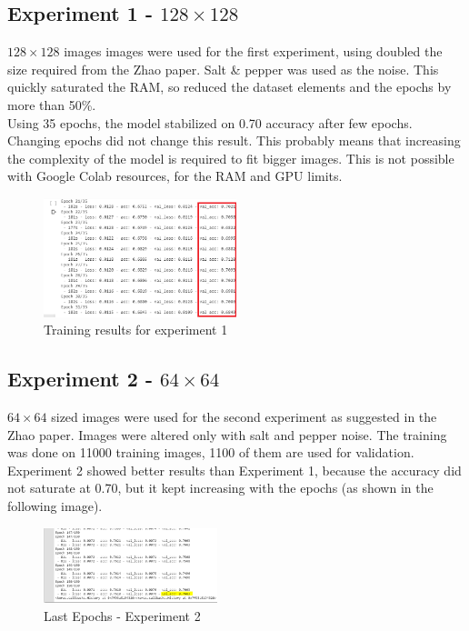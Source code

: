 \documentclass[twocolumn,showpacs,%
  nofootinbib,aps,superscriptaddress,%
  eqsecnum,prd,notitlepage,showkeys,10pt]{revtex4-1}
\begin{document}
\subsection{Experiment 1 - $128\times128$}\label{subs:ex1}
$128\times128$ images images were used for the first experiment, using doubled the size required from the Zhao paper. Salt \& pepper was used as the noise. This quickly saturated the RAM, so reduced the dataset elements and the epochs by more than 50\%.\\
Using 35 epochs, the model stabilized on 0.70 accuracy after few epochs. Changing epochs did not change this result. This probably means that increasing the complexity of the model is required to fit bigger images. This is not possible with Google Colab resources, for the RAM and GPU limits.\\
\begin{figure}[H]
\includegraphics[width=0.5\textwidth]{images/128x128_35epoch_10batch_fit.png}
\caption{\label{fig:your-figure}Training results for experiment 1}
\end{figure}

\subsection{Experiment 2 - $64\times64$}\label{subs:ex2}
$64\times64$ sized images were used for the second experiment as suggested in the Zhao paper. Images were altered only with salt and pepper noise. The training was done on 11000 training images, 1100 of them are used for validation.\\
Experiment 2 showed better results than Experiment 1, because the accuracy did not saturate at 0.70, but it kept increasing with the epochs (as shown in the following image).\\
\begin{figure}[H]
    \includegraphics[width=0.45\textwidth]{images/fit_last_64x150.PNG}
    \caption{\label{fig:noise}Last Epochs - Experiment 2}
\end{figure}
\end{document}
